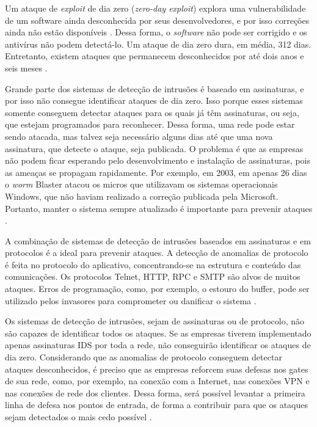 Um ataque de \textit{exploit} de dia zero (\textit{zero-day exploit}) explora uma vulnerabilidade de um software ainda desconhecida por seus desenvolvedores, e por isso correções ainda não estão disponíveis \cite{Egelman:2013}. Dessa forma, o \textit{software} não pode ser corrigido e os antivírus não podem detectá-lo. Um ataque de dia zero dura, em média, 312 dias. Entretanto, existem ataques que permanecem desconhecidos por até dois anos e seis meses \cite{Bilge:2012}. 

Grande parte dos sistemas de detecção de intrusões é baseado em assinaturas, e por isso não consegue identificar ataques de dia zero. Isso porque esses sistemas somente conseguem detectar ataques para os quais já têm assinaturas, ou seja, que estejam programados para reconhecer. Dessa forma, uma rede pode estar sendo atacada, mas talvez seja necessário alguns dias até que uma nova assinatura, que detecte o ataque, seja publicada. O problema é que as empresas não podem ficar esperando pelo desenvolvimento e instalação de assinaturas, pois as ameaças se propagam rapidamente. Por exemplo, em 2003, em apenas 26 dias o \textit{worm} Blaster atacou os micros que utilizavam os sistemas operacionais Windows, que não haviam realizado a correção publicada pela Microsoft. Portanto, manter o sistema sempre atualizado é importante para prevenir ataques \cite{McCarthy:2004}.

A combinação de sistemas de detecção de intrusões baseados em assinaturas e em protocolos é a ideal para prevenir ataques. A detecção de anomalias de protocolo é feita no protocolo do aplicativo, concentrando-se na estrutura e conteúdo das comunicações. Os protocolos Telnet, HTTP, RPC e SMTP são alvos de muitos ataques. Erros de programação, como, por exemplo, o estouro do buffer, pode ser utilizado pelos invasores para comprometer ou danificar o sistema \cite{McCarthy:2004}.

Os sistemas de detecção de intrusões, sejam de assinaturas ou de protocolo, não são capazes de identificar todos os ataques. Se as empresas tiverem implementado apenas assinaturas IDS por toda a rede, não conseguirão identificar os ataques de dia zero. Considerando que as anomalias de protocolo conseguem detectar ataques desconhecidos, é preciso que as empresas reforcem suas defesas nos gates de sua rede, como, por exemplo, na conexão com a Internet, nas conexões VPN e nas conexões de rede dos clientes. Dessa forma, será possível levantar a primeira linha de defesa nos pontos de entrada, de forma a contribuir para que os ataques sejam detectados o mais cedo possível \cite{McCarthy:2004}.


